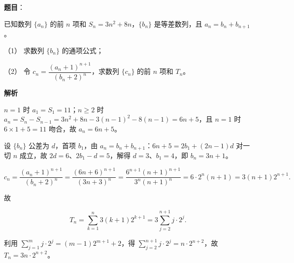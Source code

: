 \begin{answer}

\textbf{题目}：

已知数列 \(\{a_{n}\}\) 的前 \(n\) 项和 \(S_{n}=3n^{2}+8n\)，\(\{b_{n}\}\) 是等差数列，且 \(a_{n}=b_{n}+b_{n+1}\)。

（1） 求数列 \(\{b_{n}\}\) 的通项公式；

（2） 令 \(c_{n}=\dfrac{(a_{n}+1)^{n+1}}{(b_{n}+2)^{n}}\)，求数列 \(\{c_{n}\}\) 的前 \(n\) 项和 \(T_{n}\)。

\textbf{解析}


\(n=1\) 时 \(a_{1}=S_{1}=11\)；\(n\geqslant 2\) 时 \(a_{n}=S_{n}-S_{n-1}=3n^{2}+8n-3(n-1)^{2}-8(n-1)=6n+5\)，且 \(n=1\) 时 \(6\times 1+5=11\) 吻合，故 \(a_{n}=6n+5\)。

设 \(\{b_{n}\}\) 公差为 \(d\)，首项 \(b_{1}\)，由 \(a_{n}=b_{n}+b_{n+1}\)：\(6n+5=2b_{1}+(2n-1)d\) 对一切 \(n\) 成立，故 \(2d=6\)、\(2b_{1}-d=5\)，解得 \(d=3\)、\(b_{1}=4\)，即 \(b_{n}=3n+1\)。


\nopagebreak[4]
\[
c_{n}=\dfrac{(a_{n}+1)^{n+1}}{(b_{n}+2)^{n}}=\dfrac{(6n+6)^{n+1}}{(3n+3)^{n}}=\dfrac{6^{n+1}(n+1)^{n+1}}{3^{n}(n+1)^{n}}=6\cdot 2^{n}(n+1)=3(n+1)2^{n+1}.
\]

故

\nopagebreak[4]
\[
T_{n}=\sum_{k=1}^{n}3(k+1)2^{k+1}=3\sum_{j=2}^{n+1}j\cdot 2^{j}.
\]

利用 \(\sum\limits_{j=1}^{m}j\cdot 2^{j}=(m-1)2^{m+1}+2\)，得 \(\sum\limits_{j=2}^{n+1}j\cdot 2^{j}=n\cdot 2^{n+2}\)，故 \(T_{n}=3n\cdot 2^{n+2}\)。



\end{answer}
